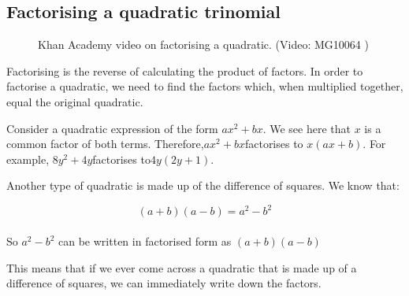 \subsection* {Factorising a quadratic trinomial }
\nopagebreak
\label{m39394*eip-218}
\setcounter{subfigure}{0}
\begin{figure}[H] %
\textnormal{Khan Academy video on factorising a quadratic.}\vspace{.1in} \nopagebreak
\label{m39394*yt-media2}\label{m39394*yt-video2}
 { (Video:  MG10064 )}
\vspace{2pt}
\vspace{.1in}
\end{figure}       \par \label{m39394*eip-411}Factorising is the reverse of calculating the product of factors. In order to factorise a quadratic, we need to find the factors which, when multiplied together, equal the original quadratic.\par 

\label{m39394*id275057}Consider a quadratic expression of the form $a{x}^{2}+bx$\hspace{1ex}. We see here that $x$ is a common factor of both terms. Therefore,\hspace{1ex}$a{x}^{2}+bx$\hspace{1ex}factorises to $x\left(ax+b\right)$. For example, $8{y}^{2}+4y$\hspace{1ex}factorises to\hspace{1ex}$4y\left(2y+1\right)$.\par 
\label{m39394*id275188}Another type of quadratic is made up of the difference of squares. We know that:\par 
\label{m39394*id275192}\nopagebreak\noindent{}

\begin{equation*}
\left(a+b\right)\left(a-b\right)={a}^{2}-{b}^{2}
\end{equation*}
\\
So $a^2-b^2$ can be written in factorised form as $(a+b)(a-b)$ \par


This means that if we ever come across a quadratic that is made up of a difference of squares, we can immediately write down the factors. 


